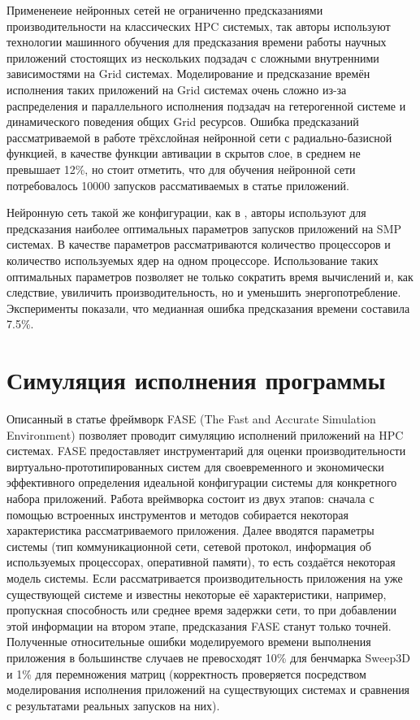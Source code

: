 	Примененеие нейронных сетей не ограниченно предсказаниями производительности на классических HPC системых, так авторы \cite{ML_Grid} используют технологии машинного обучения для предсказания времени работы научных приложений стостоящих из нескольких подзадач с сложными внутренними зависимостями на Grid системах. Моделирование и предсказание времён исполнения таких приложений на Grid системах очень сложно из-за распределения и параллельного исполнения подзадач на гетерогенной системе и динамического поведения общих Grid ресурсов. Ошибка предсказаний рассматриваемой в работе трёхслойная нейронной сети с радиально-базисной функцией, в качестве функции автивации в скрытов слое, в среднем не превышает 12\%, но стоит отметить, что для обучения нейронной сети потребовалось 10000 запусков рассмативаемых в статье приложений.

	Нейронную сеть такой же конфигурации, как в \cite{ML_SMG2000}, авторы \cite{ML_PROC_KERN} используют для предсказания наиболее оптимальных параметров запусков приложений на SMP системах. В качестве параметров рассматриваются количество процессоров и количество используемых ядер на одном процессоре. Использование таких оптимальных параметров позволяет не только сократить время вычислений и, как следствие, увиличить производительность, но и уменьшить энергопотребление. Эксперименты показали, что медианная ошибка предсказания времени составила 7.5\%.



	\section{Симуляция исполнения программы}

	
	Описанный в статье \cite{simulation_FASE} фреймворк FASE (The Fast and Accurate Simulation Environment) позволяет проводит симуляцию исполнений приложений на HPC системах. 
	FASE предоставляет инструментарий для оценки производительности виртуально-прототипированных систем для своевременного и экономически эффективного определения идеальной конфигурации системы для конкретного набора приложений. Работа вреймворка состоит из двух этапов: сначала с помощью встроенных инструментов и методов собирается некоторая характеристика рассматриваемого приложения. Далее вводятся параметры системы (тип коммуникационной сети, сетевой протокол, информация об используемых процессорах, оперативной памяти),	то есть создаётся некоторая модель системы. Если рассматривается производительность приложения на уже существующей системе и известны некоторые её характеристики, например, пропускная способность или среднее время задержки сети, то при добавлении этой информации на втором этапе, предсказания FASE станут только точней. Полученные относительные ошибки моделируемого времени выполнения приложения в большинстве случаев не превосходят 10\% для бенчмарка Sweep3D и 1\% для перемножения матриц (корректность проверяется посредством моделирования исполнения приложений на существующих системах и сравнения с результатами реальных запусков на них).

